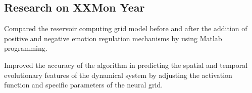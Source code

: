 \documentclass[a4paper, 12pt]{article}
\begin{document}
\subsection {{Research on XX}\hfill Mon Year}
\begin{zitemize}
\item Compared the reservoir computing grid model before and after the addition of positive and negative emotion regulation mechanisms by using Matlab programming. 
\item Improved the accuracy of the algorithm in predicting the spatial and temporal evolutionary features of the dynamical system by adjusting the activation function and specific parameters of the neural grid.  
\end{zitemize}
\end{document}
